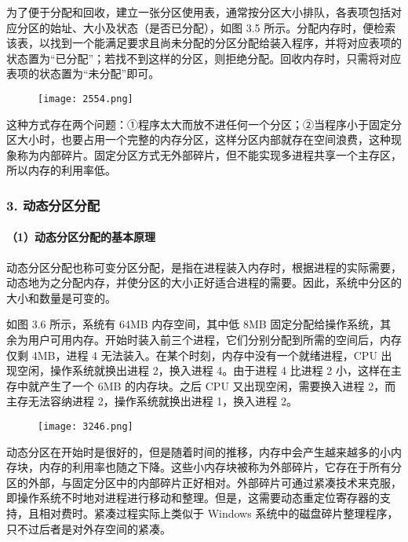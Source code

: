 \documentclass{ctexbook}
\begin{document}
	为了便于分配和回收，建立一张分区使用表，通常按分区大小排队，各表项包括对应分区的始址、大小及状态（是否已分配），如图 3.5 所示。分配内存时，便检索该表，以找到一个能满足要求且尚未分配的分区分配给装入程序，并将对应表项的状态置为“已分配”；若找不到这样的分区，则拒绝分配。回收内存时，只需将对应表项的状态置为“未分配”即可。
	
	\begin{figure}[h]
		\centering
		\texttt{[image: 2554.png]}
		\label{fig:ttttttt}
	\end{figure}
	
	这种方式存在两个问题：①程序太大而放不进任何一个分区；②当程序小于固定分区大小时，也要占用一个完整的内存分区，这样分区内部就存在空间浪费，这种现象称为内部碎片。固定分区方式无外部碎片，但不能实现多进程共享一个主存区，所以内存的利用率低。
	
	\subsubsection{3. 动态分区分配}
	\paragraph{（1）动态分区分配的基本原理}
	动态分区分配也称可变分区分配，是指在进程装入内存时，根据进程的实际需要，动态地为之分配内存，并使分区的大小正好适合进程的需要。因此，系统中分区的大小和数量是可变的。
	
	如图 3.6 所示，系统有 64MB 内存空间，其中低 8MB 固定分配给操作系统，其余为用户可用内存。开始时装入前三个进程，它们分别分配到所需的空间后，内存仅剩 4MB，进程 4 无法装入。在某个时刻，内存中没有一个就绪进程，CPU 出现空闲，操作系统就换出进程 2，换入进程 4。由于进程 4 比进程 2 小，这样在主存中就产生了一个 6MB 的内存块。之后 CPU 又出现空闲，需要换入进程 2，而主存无法容纳进程 2，操作系统就换出进程 1，换入进程 2。
	
	\begin{figure}[h]
		\centering
		\texttt{[image: 3246.png]}
		\label{fig:tttttttt}
	\end{figure}
	
	动态分区在开始时是很好的，但是随着时间的推移，内存中会产生越来越多的小内存块，内存的利用率也随之下降。这些小内存块被称为外部碎片，它存在于所有分区的外部，与固定分区中的内部碎片正好相对。外部碎片可通过紧凑技术来克服，即操作系统不时地对进程进行移动和整理。但是，这需要动态重定位寄存器的支持，且相对费时。紧凑过程实际上类似于 Windows 系统中的磁盘碎片整理程序，只不过后者是对外存空间的紧凑。
	
\end{document}
